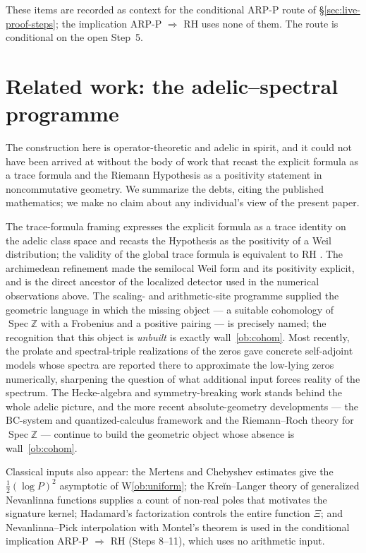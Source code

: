 \documentclass[11pt]{amsart}
\theoremstyle{definition}
\theoremstyle{remark}
\theoremstyle{definition}
\newcommand{\Spec}{\operatorname{Spec}}
\begin{document}
\noindent These items are recorded as context for the conditional ARP-P route of
\S\ref{sec:live-proof-steps}; the implication ARP-P $\Rightarrow$ RH uses none of them. The route is
conditional on the open Step~5.

\section{Related work: the adelic--spectral programme}\label{sec:relwork}

The construction here is operator-theoretic and adelic in spirit, and it could not have been arrived at
without the body of work that recast the explicit formula as a trace formula and the Riemann Hypothesis as
a positivity statement in noncommutative geometry. We summarize the debts, citing the published
mathematics; we make no claim about any individual's view of the present paper.

The trace-formula framing \cite{connes1999} expresses the explicit formula as a trace identity on the
adelic class space and recasts the Hypothesis as the positivity of a Weil distribution; the validity of
the global trace formula is equivalent to RH \cite{connes1999}. The archimedean refinement
\cite{connesconsani2021} made the semilocal Weil form and its positivity explicit, and is the direct
ancestor of the localized detector used in the numerical observations above. The scaling- and arithmetic-site
programme \cite{connesconsani-site} supplied the geometric language in which the missing object --- a
suitable cohomology of $\Spec\mathbb Z$ with a Frobenius and a positive pairing --- is precisely named;
the recognition that this object is \emph{unbuilt} is exactly wall~\ref{ob:cohom}. Most recently, the prolate and
spectral-triple realizations of the zeros \cite{ccm-prolate,ccm-zeta} gave concrete self-adjoint models
whose spectra are reported there to approximate the low-lying zeros numerically, sharpening the question of what additional input
forces reality of the spectrum. The Hecke-algebra and symmetry-breaking work \cite{bostconnes} stands
behind the whole adelic picture, and the more recent absolute-geometry developments --- the
$\mathrm{BC}$-system and quantized-calculus framework \cite{ConnesConsaniBC} and the Riemann--Roch theory
for $\Spec\mathbb Z$ \cite{ConnesConsaniRR} --- continue to build the geometric object whose absence is
wall~\ref{ob:cohom}.

Classical inputs also appear: the Mertens and Chebyshev estimates \cite{IwaniecKowalski,Davenport} give
the $\tfrac12(\log P)^2$ asymptotic of W\ref{ob:uniform}; the Kreĭn--Langer theory of generalized
Nevanlinna functions \cite{KreinLanger} supplies a count of non-real poles that motivates the signature kernel; Hadamard's factorization
\cite{Titchmarsh} controls the entire function $\Xi$; and Nevanlinna--Pick interpolation \cite{FoiasFrazho} with Montel's
theorem \cite{Remmert} is used in the conditional implication ARP-P $\Rightarrow$ RH (Steps 8--11),
which uses no arithmetic input.
\end{document}
